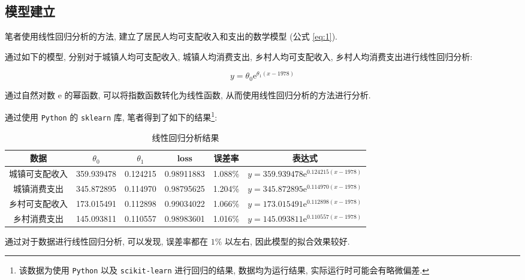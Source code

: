 \documentclass{article}
\begin{document}
\subsection{模型建立}
\par 笔者使用线性回归分析的方法, 建立了居民人均可支配收入和支出的数学模型 (公式 \ref{eq:1}).\\
\par 通过如下的模型, 分别对于城镇人均可支配收入, 城镇人均消费支出, 乡村人均可支配收入, 乡村人均消费支出进行线性回归分析:

\begin{equation}
  \label{eq:1}
  y=\theta_0\mathrm e^{\theta_1\left(x-1978\right)}
\end{equation}

\par 通过自然对数 $\mathrm e$ 的幂函数, 可以将指数函数转化为线性函数, 从而使用线性回归分析的方法进行分析.\\
\par 通过使用 \texttt{Python} 的 \texttt{sklearn} 库, 笔者得到了如下的结果\footnote{该数据为使用 \texttt{Python} 以及 \texttt{scikit-learn} 进行回归的结果, 数据均为运行结果, 实际运行时可能会有略微偏差.}:

\begin{table}[H]
  \centering
  \caption{线性回归分析结果}
  \label{tab:1}
  \begin{tabular}{cccccc}
    \hline
    \textbf{数据} & \textbf{$\theta_0$} & \textbf{$\theta_1$} & \textbf{loss} & \textbf{误差率} & \textbf{表达式} \\
    \hline
    城镇可支配收入 & 359.939478 & 0.124215 & 0.98911883 & 1.088\% & $y=359.939478\mathrm e^{0.124215\left(x-1978\right)}$ \\
    城镇消费支出 & 345.872895 & 0.114970 & 0.98795625 & 1.204\% & $y=345.872895\mathrm e^{0.114970\left(x-1978\right)}$ \\
    乡村可支配收入 & 173.015491 & 0.112898 & 0.99034022 & 1.066\% & $y=173.015491\mathrm e^{0.112898\left(x-1978\right)}$ \\
    乡村消费支出 & 145.093811 & 0.110557 & 0.98983601 & 1.016\% & $y=145.093811\mathrm e^{0.110557\left(x-1978\right)}$ \\
    \hline
  \end{tabular}
\end{table}

\par 通过对于数据进行线性回归分析, 可以发现, 误差率都在 $1\%$ 以左右, 因此模型的拟合效果较好.\\
\end{document}
